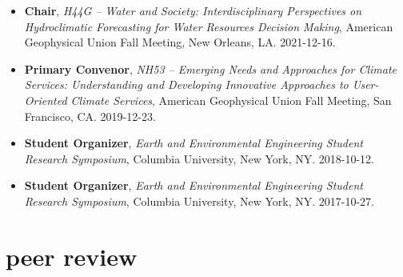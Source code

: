 \documentclass[10pt,oneside]{article}
\begin{document}
\begin{itemize}[label={}]
  
  \item \textbf{Chair}, \textit{H44G -- Water and Society: Interdisciplinary Perspectives on Hydroclimatic Forecasting for Water Resources Decision Making}, American Geophysical Union Fall Meeting, New Orleans, LA. 2021-12-16.
        
  \item \textbf{Primary Convenor}, \textit{NH53 -- Emerging Needs and Approaches for Climate Services: Understanding and Developing Innovative Approaches to User-Oriented Climate Services}, American Geophysical Union Fall Meeting, San Francisco, CA. 2019-12-23.
        
  \item \textbf{Student Organizer}, \textit{Earth and Environmental Engineering Student Research Symposium}, Columbia University, New York, NY. 2018-10-12.
        
  \item \textbf{Student Organizer}, \textit{Earth and Environmental Engineering Student Research Symposium}, Columbia University, New York, NY. 2017-10-27.
        
\end{itemize}


\section{peer review}

\mbox{}\vspace{-\dimexpr\baselineskip\relax}
\end{document}
